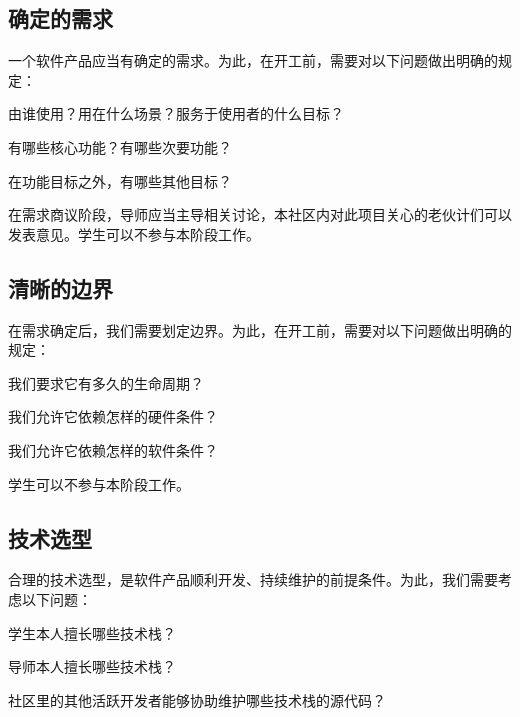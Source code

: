 \subsection{确定的需求}

一个软件产品应当有确定的需求。为此，在开工前，需要对以下问题做出明确的规定：

\begin{compactitem}
	\item 由谁使用？用在什么场景？服务于使用者的什么目标？
	\item 有哪些核心功能？有哪些次要功能？
	\item 在功能目标之外，有哪些其他目标？
\end{compactitem}

在需求商议阶段，导师应当主导相关讨论，本社区内对此项目关心的老伙计们可以发表意见。学生可以不参与本阶段工作。

\subsection{清晰的边界}

在需求确定后，我们需要划定边界。为此，在开工前，需要对以下问题做出明确的规定：

\begin{compactitem}
	\item 我们要求它有多久的生命周期？
	\item 我们允许它依赖怎样的硬件条件？
	\item 我们允许它依赖怎样的软件条件？
\end{compactitem}

学生可以不参与本阶段工作。

\subsection{技术选型}

合理的技术选型，是软件产品顺利开发、持续维护的前提条件。为此，我们需要考虑以下问题：

\begin{compactitem}
	\item 学生本人擅长哪些技术栈？
	\item 导师本人擅长哪些技术栈？
	\item 社区里的其他活跃开发者能够协助维护哪些技术栈的源代码？
\end{compactitem}

